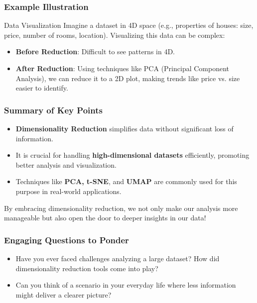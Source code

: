 \documentclass[aspectratio=169]{beamer}
\begin{document}
\begin{frame}[fragile]
    \frametitle{Example Illustration}
    
    \begin{block}{Data Visualization}
        Imagine a dataset in 4D space (e.g., properties of houses: size, price, number of rooms, location). Visualizing this data can be complex:
        \begin{itemize}
            \item \textbf{Before Reduction}: Difficult to see patterns in 4D.
            \item \textbf{After Reduction}: Using techniques like PCA (Principal Component Analysis), we can reduce it to a 2D plot, making trends like price vs. size easier to identify.
        \end{itemize}
    \end{block}
\end{frame}

\begin{frame}[fragile]
    \frametitle{Summary of Key Points}
    
    \begin{itemize}
        \item \textbf{Dimensionality Reduction} simplifies data without significant loss of information.
        \item It is crucial for handling \textbf{high-dimensional datasets} efficiently, promoting better analysis and visualization.
        \item Techniques like \textbf{PCA, t-SNE}, and \textbf{UMAP} are commonly used for this purpose in real-world applications.
    \end{itemize}
    
    By embracing dimensionality reduction, we not only make our analysis more manageable but also open the door to deeper insights in our data!
\end{frame}

\begin{frame}[fragile]
    \frametitle{Engaging Questions to Ponder}
    
    \begin{itemize}
        \item Have you ever faced challenges analyzing a large dataset? How did dimensionality reduction tools come into play?
        \item Can you think of a scenario in your everyday life where less information might deliver a clearer picture?
    \end{itemize}
\end{frame}
\end{document}
